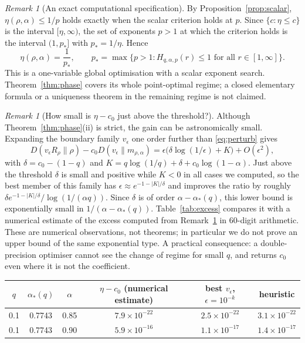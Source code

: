 \documentclass[11pt,a4paper]{article}
\numberwithin{equation}{section}
\theoremstyle{definition}
\theoremstyle{remark}
\newtheorem{remark}[theorem]{Remark}
\newcommand{\KL}{D}
\newcommand{\mra}{m_{\rho,\alpha}}
\newcommand{\ac}{\alpha_*}
\begin{document}
\begin{remark}[An exact computational specification]\label{rem:compute}
By Proposition~\ref{prop:scalar}, \(\eta(\rho,\alpha)\le1/p\) holds exactly
when the scalar criterion holds at \(p\). Since \(\{c:\eta\le c\}\) is the
interval \([\eta,\infty)\), the set of exponents \(p>1\) at which the
criterion holds is the interval \((1,p_*]\) with \(p_*=1/\eta\). Hence
\[
\eta(\rho,\alpha)=\frac1{p_*},\qquad
p_* =\max\{p>1:H_{q,\alpha,p}(r)\le1\text{ for all }r\in[1,\infty]\}.
\]
This is a one-variable global optimisation with a scalar exponent search.
Theorem~\ref{thm:phase} covers its whole point-optimal regime; a closed
elementary formula or a uniqueness theorem in the remaining regime is not
claimed.
\end{remark}

\begin{remark}[How small is \(\eta-c_0\) just above the threshold?]\label{rem:excess}
Although Theorem~\ref{thm:phase}(ii) is strict, the gain can be
astronomically small. Expanding the boundary family \(v_\epsilon\) one
order further than \eqref{eq:perturb} gives
\[
\KL(v_\epsilon R_\rho\|\rho)-c_0\KL(v_\epsilon\|\mra)
=\epsilon\big(\delta\log(1/\epsilon)+K\big)+O(\epsilon^2),
\]
with \(\delta=c_0-(1-q)\) and \(K=q\log(1/q)+\delta+c_0\log(1-\alpha)\).
Just above the threshold \(\delta\) is small and positive while \(K<0\) in
all cases we computed, so the best member of this family has
\(\epsilon\approx e^{-1-|K|/\delta}\) and improves the ratio by roughly
\(\delta e^{-1-|K|/\delta}/\log(1/(\alpha q))\). Since \(\delta\) is of
order \(\alpha-\ac(q)\), this lower bound is exponentially small in
\(1/(\alpha-\ac(q))\). Table~\ref{tab:excess} compares it with a numerical estimate of the
excess computed from Remark~\ref{rem:compute} in 60-digit arithmetic. These
are numerical observations, not theorems; in particular we do not prove an
upper bound of the same exponential type. A practical consequence: a
double-precision optimiser cannot see the change of regime for small \(q\),
and returns \(c_0\) even where it is not the coefficient.
\begin{table}[htbp]
\centering
\small
\begin{tabular}{@{}cccccc@{}}
\toprule
\(q\) & \(\ac(q)\) & \(\alpha\) & \(\eta-c_0\) (numerical estimate) &
best \(v_\epsilon\), \(\epsilon=10^{-k}\) & heuristic\\
\midrule
0.1 & 0.7743 & 0.85 & \(7.9\times10^{-22}\) & \(2.5\times10^{-22}\) & \(3.1\times10^{-22}\)\\
0.1 & 0.7743 & 0.90 & \(5.9\times10^{-16}\) & \(1.1\times10^{-17}\) & \(1.4\times10^{-17}\)\\

\end{tabular}
\end{table}
\end{remark}
\end{document}
